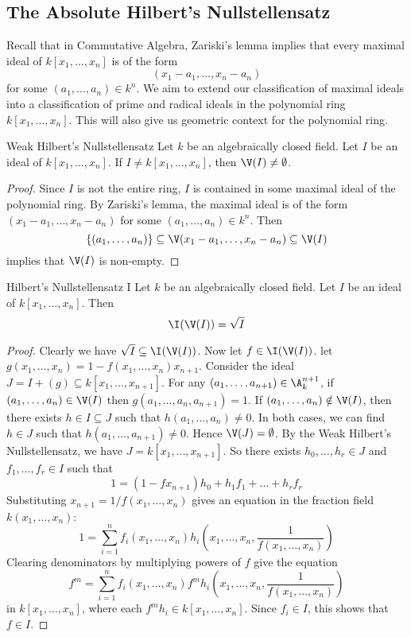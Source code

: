 \documentclass[a4paper]{article}
\begin{document}
\subsection{The Absolute Hilbert's Nullstellensatz}
Recall that in Commutative Algebra, Zariski's lemma implies that every maximal ideal of $k[x_1,\dots,x_n]$ is of the form $$(x_1-a_1,\dots,x_n-a_n)$$ for some $(a_1,\dots,a_n)\in k^n$. We aim to extend our classification of maximal ideals into a classification of prime and radical ideals in the polynomial ring $k[x_1,\dots,x_n]$. This will also give us geometric context for the polynomial ring. 

\begin{thm}{Weak Hilbert's Nullstellensatz}{} Let $k$ be an algebraically closed field. Let $I$ be an ideal of $k[x_1,\dots,x_n]$. If $I\neq k[x_1,\dots,x_n]$, then $\V(I)\neq\emptyset$. 
\begin{proof}
Since $I$ is not the entire ring, $I$ is contained in some maximal ideal of the polynomial ring. By Zariski's lemma, the maximal ideal is of the form $(x_1-a_1,\dots,x_n-a_n)$ for some $(a_1,\dots,a_n)\in k^n$. Then $$\{(a_1,\dots,a_n)\}\subseteq\V(x_1-a_1,\dots,x_n-a_n)\subseteq\V(I)$$ implies that $\V(I)$ is non-empty. 
\end{proof}
\end{thm}

\begin{thm}{Hilbert's Nullstellensatz I}{} Let $k$ be an algebraically closed field. Let $I$ be an ideal of $k[x_1,\dots,x_n]$. Then $$\I(\V(I))=\sqrt{I}$$ 
\begin{proof}
Clearly we have $\sqrt{I}\subseteq\I(\V(I))$. Now let $f\in\I(\V(I))$. let $g(x_1,\dots,x_n)=1-f(x_1,\dots,x_n)x_{n+1}$. Consider the ideal $J=I+(g)\subseteq k[x_1,\dots,x_{n+1}]$. For any $(a_1,\dots,a_{n+1})\in\A_k^{n+1}$, if $(a_1,\dots,a_n)\in\V(I)$ then $g(a_1,\dots,a_n,a_{n+1})=1$. If $(a_1,\dots,a_n)\notin\V(I)$, then there exists $h\in I\subseteq J$ such that $h(a_1,\dots,a_n)\neq 0$. In both cases, we can find $h\in J$ such that $h(a_1,\dots,a_{n+1})\neq 0$. Hence $\V(J)=\emptyset$. By the Weak Hilbert's Nullstellensatz, we have $J=k[x_1,\dots,x_{n+1}]$. So there exists $h_0,\dots,h_r\in J$ and $f_1,\dots,f_r\in I$ such that $$1=(1-fx_{n+1})h_0+h_1f_1+\dots+h_rf_r$$ Substituting $x_{n+1}=1/f(x_1,\dots,x_n)$ gives an equation in the fraction field $k(x_1,\dots,x_n)$: $$1=\sum_{i=1}^nf_i(x_1,\dots,x_n)h_i\left(x_1,\dots,x_n,\frac{1}{f(x_1,\dots,x_n)}\right)$$ Clearing denominators by multiplying powers of $f$ give the equation $$f^m=\sum_{i=1}^nf_i(x_1,\dots,x_n)f^mh_i\left(x_1,\dots,x_n,\frac{1}{f(x_1,\dots,x_n)}\right)$$ in $k[x_1,\dots,x_n]$, where each $f^mh_i\in k[x_1,\dots,x_n]$. Since $f_i\in I$, this shows that $f\in I$. 
\end{proof}
\end{thm}
\end{document}
